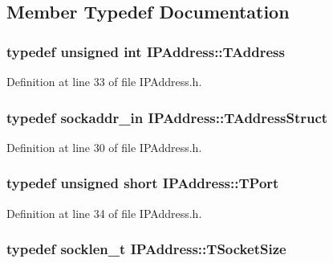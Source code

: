 \subsection{Member Typedef Documentation}
\hypertarget{class_i_p_address_a36831f63346275f44e8747d77a2a5d51}{
\subsubsection[{T\-Address}]{\setlength{\rightskip}{0pt plus 5cm}typedef unsigned int {\bf I\-P\-Address\-::\-T\-Address}}}\label{class_i_p_address_a36831f63346275f44e8747d77a2a5d51}


Definition at line 33 of file I\-P\-Address.\-h.

\hypertarget{class_i_p_address_a45062a631f57459b18c10c1c8fe310bf}{
\subsubsection[{T\-Address\-Struct}]{\setlength{\rightskip}{0pt plus 5cm}typedef sockaddr\-\_\-in {\bf I\-P\-Address\-::\-T\-Address\-Struct}\hspace{0.3cm}{\ttfamily [private]}}}\label{class_i_p_address_a45062a631f57459b18c10c1c8fe310bf}


Definition at line 30 of file I\-P\-Address.\-h.

\hypertarget{class_i_p_address_a51188195685c31d4258c0a078cc37154}{
\subsubsection[{T\-Port}]{\setlength{\rightskip}{0pt plus 5cm}typedef unsigned short {\bf I\-P\-Address\-::\-T\-Port}}}\label{class_i_p_address_a51188195685c31d4258c0a078cc37154}


Definition at line 34 of file I\-P\-Address.\-h.

\hypertarget{class_i_p_address_a28c76ca7e5d4aa86d2caf0b742a23cdb}{
\subsubsection[{T\-Socket\-Size}]{\setlength{\rightskip}{0pt plus 5cm}typedef socklen\-\_\-t {\bf I\-P\-Address\-::\-T\-Socket\-Size}}}\label{class_i_p_address_a28c76ca7e5d4aa86d2caf0b742a23cdb}



